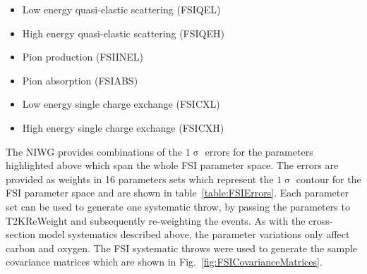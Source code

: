 \begin{itemize}
  \item Low energy quasi-elastic scattering (FSIQEL)
  \item High energy quasi-elastic scattering (FSIQEH)
  \item Pion production (FSIINEL)
  \item Pion absorption (FSIABS)
  \item Low energy single charge exchange (FSICXL)
  \item High energy single charge exchange (FSICXH)
\end{itemize}
The NIWG provides combinations of the $1\upsigma$ errors for the parameters highlighted above which span the whole FSI parameter space.  The errors are provided as weights in 16 parameters sets which represent the $1\upsigma$ contour for the FSI parameter space and are shown in table~\ref{table:FSIErrors}.  Each parameter set can be used to generate one systematic throw, by passing the parameters to T2KReWeight and subsequently re-weighting the events.  As with the cross-section model systematics described above, the parameter variations only affect carbon and oxygen.  The FSI systematic throws were used to generate the sample covariance matrices which are shown in Fig.~\ref{fig:FSICovarianceMatrices}.
